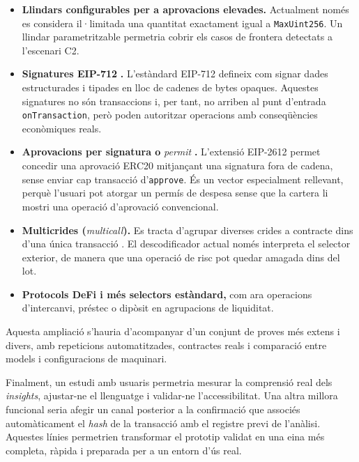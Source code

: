 \begin{itemize}
    \item \textbf{Llindars configurables per a aprovacions elevades.} Actualment només es considera il·limitada una quantitat exactament igual a \texttt{MaxUint256}. Un llindar parametritzable permetria cobrir els casos de frontera detectats a l'escenari C2.

    \item \textbf{Signatures EIP-712} \cite{eip712}\textbf{.} L'estàndard EIP-712 defineix com signar dades estructurades i tipades en lloc de cadenes de bytes opaques. Aquestes signatures no són transaccions i, per tant, no arriben al punt d'entrada \texttt{onTransaction}, però poden autoritzar operacions amb conseqüències econòmiques reals.

    \item \textbf{Aprovacions per signatura o} \textit{permit} \cite{eip2612}\textbf{.} L'extensió EIP-2612 permet concedir una aprovació ERC20 mitjançant una signatura fora de cadena, sense enviar cap transacció d'\texttt{approve}. És un vector especialment rellevant, perquè l'usuari pot atorgar un permís de despesa sense que la cartera li mostri una operació d'aprovació convencional.

    \item \textbf{Multicrides (}\textit{multicall}\textbf{).} Es tracta d'agrupar diverses crides a contracte dins d'una única transacció \cite{openzeppelin_contracts}. El descodificador actual només interpreta el selector exterior, de manera que una operació de risc pot quedar amagada dins del lot.

    \item \textbf{Protocols DeFi i més selectors estàndard,} com ara operacions d'intercanvi, préstec o dipòsit en agrupacions de liquiditat.
\end{itemize}

Aquesta ampliació s'hauria d'acompanyar d'un conjunt de proves més extens i divers, amb repeticions automatitzades, contractes reals i comparació entre models i configuracions de maquinari.

Finalment, un estudi amb usuaris permetria mesurar la comprensió real dels \textit{insights}, ajustar-ne el llenguatge i validar-ne l'accessibilitat. Una altra millora funcional seria afegir un canal posterior a la confirmació que associés automàticament el \textit{hash} de la transacció amb el registre previ de l'anàlisi. Aquestes línies permetrien transformar el prototip validat en una eina més completa, ràpida i preparada per a un entorn d'ús real.

